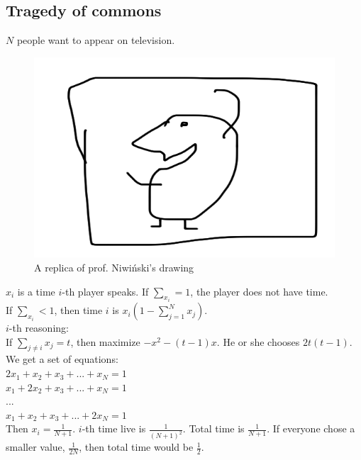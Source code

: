 \subsection*{Tragedy of commons}
$N$ people want to appear on television.
\begin{figure}[H]
    \centering
    \caption{A replica of prof. Niwiński's drawing}
    \includegraphics[scale=0.1]{content/graphics/game24.png}
\end{figure}
\noindent
$x_i$ is a time $i$-th player speaks. If $\sum_{x_i} = 1$, the player does not have time.\\
If $\sum_{x_i} < 1$, then time $i$ is $x_i (1 - \sum_{j=1}^{N} x_j)$.\\
$i$-th reasoning:\\
If $\sum_{j \neq i} x_j = t$, then maximize $-x^2 - (t-1)x$. He or she chooses $2t(t-1)$.\\
We get a set of equations:\\
$2x_1 + x_2 + x_3 + ... + x_N = 1$\\
$x_1 + 2x_2 + x_3 + ... + x_N = 1$\\
...\\
$x_1 + x_2 + x_3 + ... + 2x_N = 1$\\
Then $x_i = \frac{1}{N+1}$. $i$-th time live is $\frac{1}{(N+1)^2}$. Total time is $\frac{1}{N+1}$.
If everyone chose a smaller value, $\frac{1}{2N}$, then total time would be $\frac{1}{2}$.